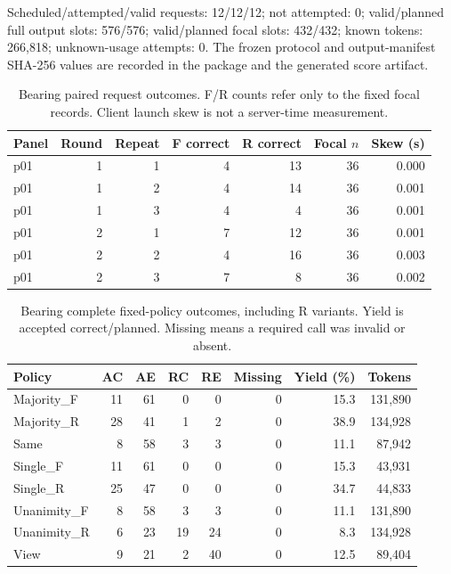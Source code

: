 \documentclass[11pt,a4paper]{article}
\begin{document}
Scheduled/attempted/valid requests: 12/12/12; not attempted: 0; valid/planned full output slots: 576/576; valid/planned focal slots: 432/432; known tokens: 266,818; unknown-usage attempts: 0. The frozen protocol and output-manifest SHA-256 values are recorded in the package and the generated score artifact.

\begin{table}[htbp]\centering\small
\caption{Bearing paired request outcomes. F/R counts refer only to the fixed focal records. Client launch skew is not a server-time measurement.}
\label{tab:policy_pairs_paderborn}
\begin{tabular}{@{}lrrrrrr@{}}\toprule
Panel & Round & Repeat & F correct & R correct & Focal $n$ & Skew (s) \\\midrule
p01 & 1 & 1 & 4 & 13 & 36 & 0.000 \\
p01 & 1 & 2 & 4 & 14 & 36 & 0.001 \\
p01 & 1 & 3 & 4 & 4 & 36 & 0.001 \\
p01 & 2 & 1 & 7 & 12 & 36 & 0.001 \\
p01 & 2 & 2 & 4 & 16 & 36 & 0.003 \\
p01 & 2 & 3 & 7 & 8 & 36 & 0.002 \\
\bottomrule\end{tabular}\end{table}

\begin{table}[htbp]\centering\small
\caption{Bearing complete fixed-policy outcomes, including R variants. Yield is accepted correct/planned. Missing means a required call was invalid or absent.}
\label{tab:policy_full_paderborn}
\begin{tabular}{@{}lrrrrrrr@{}}\toprule
Policy & AC & AE & RC & RE & Missing & Yield (\%) & Tokens \\\midrule
Majority\_F & 11 & 61 & 0 & 0 & 0 & 15.3 & 131,890 \\
Majority\_R & 28 & 41 & 1 & 2 & 0 & 38.9 & 134,928 \\
Same & 8 & 58 & 3 & 3 & 0 & 11.1 & 87,942 \\
Single\_F & 11 & 61 & 0 & 0 & 0 & 15.3 & 43,931 \\
Single\_R & 25 & 47 & 0 & 0 & 0 & 34.7 & 44,833 \\
Unanimity\_F & 8 & 58 & 3 & 3 & 0 & 11.1 & 131,890 \\
Unanimity\_R & 6 & 23 & 19 & 24 & 0 & 8.3 & 134,928 \\
View & 9 & 21 & 2 & 40 & 0 & 12.5 & 89,404 \\
\bottomrule\end{tabular}\end{table}
\end{document}
